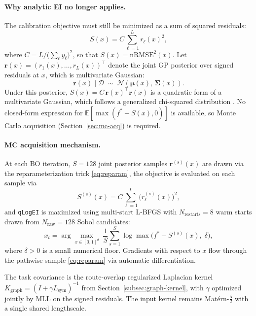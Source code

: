 \documentclass[11pt]{article}
\begin{document}
\paragraph{Why analytic EI no longer applies.}
The calibration objective must still be minimized as a sum of squared residuals:
\begin{equation}
  S(x) = C \sum_{\ell=1}^{L} r_\ell(x)^2,
  \label{eq:sq-obj}
\end{equation}
where $C = L / \bigl(\sum_\ell y_\ell\bigr)^2$, so that $S(x) = \mathrm{nRMSE}^2(x)$.
Let $\mathbf{r}(x) = (r_1(x), \ldots, r_L(x))^\top$ denote the joint GP posterior over
signed residuals at $x$, which is multivariate Gaussian:
\[
  \mathbf{r}(x) \mid \mathcal{D} \;\sim\; \mathcal{N}\!\left(\boldsymbol{\mu}(x),\,
  \boldsymbol{\Sigma}(x)\right).
\]
Under this posterior, $S(x) = C\,\mathbf{r}(x)^\top\mathbf{r}(x)$ is a quadratic form of
a multivariate Gaussian, which follows a generalized chi-squared distribution
\parencite{Imhof1961}. No closed-form expression for $\mathbb{E}[\max(f^* - S(x), 0)]$ is
available, so Monte Carlo acquisition (Section~\ref{sec:mc-acq}) is required.

\paragraph{MC acquisition mechanism.}
At each BO iteration, $S = 128$ joint posterior samples $\mathbf{r}^{(s)}(x)$ are drawn
via the reparameterization trick \eqref{eq:reparam}, the objective is evaluated on each
sample via
\begin{equation}
  S^{(s)}(x) = C \sum_{\ell=1}^{L} \bigl(r_\ell^{(s)}(x)\bigr)^2,
\end{equation}
and \texttt{qLogEI} is maximized using multi-start L-BFGS with $N_{\mathrm{restarts}} = 8$
warm starts drawn from $N_{\mathrm{raw}} = 128$ Sobol candidates:
\begin{equation}
  x_t = \arg\max_{x \in [0,1]^d}\; \frac{1}{S} \sum_{s=1}^{S}
  \log\!\max\!\bigl(f^* - S^{(s)}(x),\; \delta\bigr),
\end{equation}
where $\delta > 0$ is a small numerical floor. Gradients with respect to $x$ flow through
the pathwise sample \eqref{eq:reparam} via automatic differentiation.

The task covariance is the route-overlap regularized Laplacian kernel
$K_{\mathrm{graph}} = (I + \gamma L_{\mathrm{sym}})^{-1}$ from
Section~\ref{subsec:graph-kernel}, with $\gamma$ optimized jointly by MLL on the signed
residuals. The input kernel remains Matérn-$\tfrac{5}{2}$ with a single shared
lengthscale.
\end{document}
